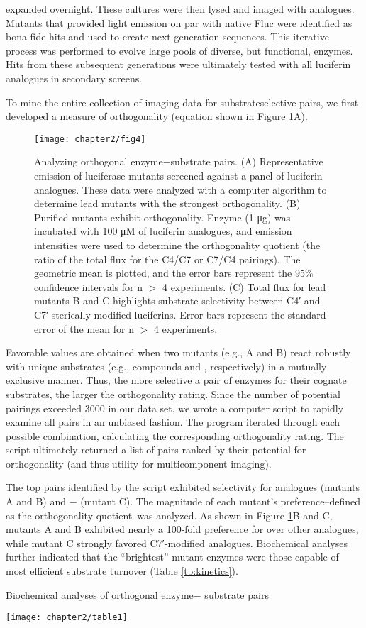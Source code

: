 expanded overnight. These cultures were then lysed and
imaged with analogues. Mutants that provided light emission
on par with native Fluc were identified as bona fide hits and used to create next-generation sequences. This iterative process
was performed to evolve large pools of diverse, but functional,
enzymes. Hits from these subsequent generations were
ultimately tested with all luciferin analogues in secondary
screens.
\par
To mine the entire collection of imaging data for substrateselective
pairs, we first developed a measure of orthogonality
(equation shown in Figure \ref{fig:mining_verifying}A).
\begin{figure}[htbp]
\texttt{[image: chapter2/fig4]}
\centering
\caption[Analyzing orthogonal enzyme−substrate pairs]{Analyzing orthogonal enzyme−substrate pairs. (A) Representative emission of luciferase mutants screened against a panel of luciferin
analogues. These data were analyzed with a computer algorithm to determine lead mutants with the strongest orthogonality. (B) Purified mutants
exhibit orthogonality. Enzyme (1 μg) was incubated with 100 μM of luciferin analogues, and emission intensities were used to determine the
orthogonality quotient (the ratio of the total flux for the C4/C7 or C7/C4 pairings). The geometric mean is plotted, and the error bars represent the
95\% confidence intervals for n $>$ 4 experiments. (C) Total flux for lead mutants B and C highlights substrate selectivity between C4′ and C7′
sterically modified luciferins. Error bars represent the standard error of the mean for n $>$ 4 experiments.}
  \label{fig:mining_verifying}
\end{figure}
Favorable values are obtained
when two mutants (e.g., A and B) react robustly with unique
substrates (e.g., compounds  and , respectively) in a mutually
exclusive manner. Thus, the more selective a pair of enzymes
for their cognate substrates, the larger the orthogonality rating.
Since the number of potential pairings exceeded 3000 in our
data set, we wrote a computer script to rapidly examine all pairs
in an unbiased fashion. The program iterated through each
possible combination, calculating the corresponding orthogonality
rating. The script ultimately returned a list of pairs ranked
by their potential for orthogonality (and thus utility for
multicomponent imaging).
\par
The top pairs identified by the script exhibited selectivity for
analogues  (mutants A and B) and − (mutant C). The
magnitude of each mutant’s preference--defined as the
orthogonality quotient--was analyzed. As shown in Figure
\ref{fig:mining_verifying}B and C, mutants A and B exhibited nearly a 100-fold preference for  over other analogues, while mutant C strongly favored C7′-modified analogues. Biochemical analyses further indicated that the “brightest”
mutant enzymes were those capable of most efficient substrate
turnover (Table \ref{tb:kinetics}).
\begin{table}
  \caption{Biochemical analyses of orthogonal enzyme−
substrate pairs}
\texttt{[image: chapter2/table1]}
\centering
  \label{tb:kinetics}
\end{table}

